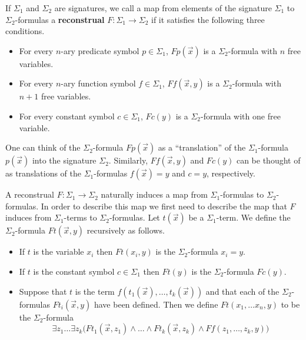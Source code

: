 






\begin{defn} If $\Sigma_1$ and $\Sigma_2$ are signatures, we call a
  map from elements of the signature $\Sigma_1$ to $\Sigma_2$-formulas
  a \textbf{reconstrual} $F:\Sigma_1\rightarrow\Sigma_2$ if it
  satisfies the following three conditions.
\begin{itemize}
\item For every $n$-ary predicate symbol $p\in\Sigma_1$,
  $Fp(\vec{x})$ is a $\Sigma_2$-formula with $n$ free
  variables.
\item For every $n$-ary function symbol $f\in\Sigma_1$,
  $Ff(\vec{x}, y)$ is a $\Sigma_2$-formula with $n+1$ free
  variables.
\item For every constant symbol $c\in\Sigma_1$, $Fc(y)$ is a $\Sigma_2$-formula with one free variable.
\end{itemize} \end{defn}

One can think of the $\Sigma_2$-formula $Fp(\vec{x})$ as a
``translation'' of the $\Sigma_1$-formula $p(\vec{x})$ into the
signature $\Sigma_2$. Similarly, $Ff(\vec{x}, y)$ and $Fc(y)$ can be
thought of as translations of the $\Sigma_1$-formulas $f(\vec{x})=y$
and $c=y$, respectively.

A reconstrual $F:\Sigma_1\rightarrow \Sigma_2$ naturally induces a map
from $\Sigma_1$-formulas to $\Sigma_2$-formulas.  In order to describe
this map we first need to describe the map that $F$ induces from
$\Sigma_1$-terms to $\Sigma_2$-formulas. Let $t(\vec{x})$ be a
$\Sigma_1$-term. We define the $\Sigma_2$-formula $Ft(\vec{x}, y)$
recursively as follows.
\begin{itemize}
\item If $t$ is the variable $x_i$ then $Ft(x_i,y)$ is the $\Sigma_2$-formula $x_i=y$.
\item If $t$ is the constant symbol $c\in\Sigma_1$ then $Ft(y)$ is the
  $\Sigma_2$-formula $Fc(y)$.
\item Suppose that $t$ is the term
  $f(t_1(\vec{x}), \ldots, t_k(\vec{x}))$ and that each of the
  $\Sigma_2$-formulas $Ft_i(\vec{x}, y)$ have been defined. Then we
  define $Ft(x_1,\ldots x_n, y)$ to be the $\Sigma_2$-formula
$$
\exists z_1\ldots\exists z_k\big(Ft_1(\vec{x}, z_1)\land\ldots\land
Ft_k(\vec{x}, z_k)\land Ff(z_1,\ldots, z_k, y)\big)
$$
\end{itemize}

